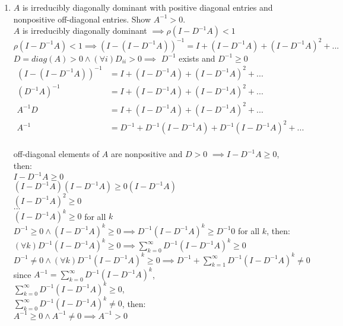 \documentclass[12pt,letter]{article}
\begin{document}

\begin{enumerate}
  
\item $A$ is irreducibly diagonally dominant with positive diagonal entries and nonpositive off-diagonal entries. Show $A^{-1}>0$.\\
  
  $A$ is irreducibly diagonally dominant $\implies \rho(I-D^{-1}A)<1$\\
  $\rho(I-D^{-1}A)<1 \implies (I-(I-D^{-1}A))^{-1} = I+(I-D^{-1}A)+(I-D^{-1}A)^2+...$\\

  $D = diag(A) > 0 \wedge (\forall i) D_{ii} > 0 \implies$  $D^{-1}$ exists and $D^{-1} \geq 0$\\
  \begin{align*}
    (I-(I-D^{-1}A))^{-1} &= I+(I-D^{-1}A)+(I-D^{-1}A)^2+...\\
    (D^{-1}A)^{-1} &= I+(I-D^{-1}A)+(I-D^{-1}A)^2+...\\
    A^{-1}D &= I+(I-D^{-1}A)+(I-D^{-1}A)^2+...\\
    A^{-1} &= D^{-1}+D^{-1}(I-D^{-1}A)+D^{-1}(I-D^{-1}A)^2+...\\
  \end{align*}

  off-diagonal elements of $A$ are nonpositive and $D>0$ $\implies I-D^{-1}A \geq 0$, then:\\
  $I-D^{-1}A \geq 0$\\
  $(I-D^{-1}A)(I-D^{-1}A) \geq 0(I-D^{-1}A)$\\
  $(I-D^{-1}A)^2 \geq 0$\\
  $...$\\
  $(I-D^{-1}A)^k \geq 0$ for all $k$\\

  $D^{-1} \geq 0 \wedge (I-D^{-1}A)^k \geq 0 \implies D^{-1}(I-D^{-1}A)^k \geq D^{-1}0$ for all $k$, then:\\
  $(\forall k) D^{-1}(I-D^{-1}A)^k \geq 0 \implies \sum_{k=0}^{\infty}D^{-1}(I-D^{-1}A)^k \geq 0$\\
  $D^{-1} \neq 0 \wedge (\forall k) D^{-1}(I-D^{-1}A)^k \geq 0 \implies D^{-1}+\sum_{k=1}^{\infty}D^{-1}(I-D^{-1}A)^k \neq 0$\\

  since $A^{-1}=\sum_{k=0}^{\infty}D^{-1}(I-D^{-1}A)^k$,\\
  $\sum_{k=0}^{\infty}D^{-1}(I-D^{-1}A)^k \geq 0$,\\
  $\sum_{k=0}^{\infty}D^{-1}(I-D^{-1}A)^k \neq 0$, then:\\
  $A^{-1} \geq 0 \wedge A^{-1} \neq 0 \implies A^{-1} > 0$\\


\end{enumerate}
\end{document}

